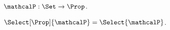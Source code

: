 \begin{signature}\label{typed_select_mismatch_predicate}
    $\mathcalP : \Set\to\Prop$.
\end{signature}

\begin{axiom}\label{typed_select_mismatch}
    $\Select[\Prop]{\mathcalP} = \Select{\mathcalP}$.
\end{axiom}
